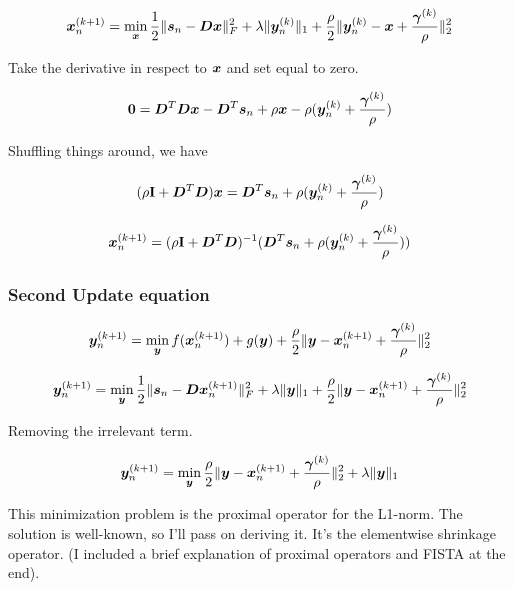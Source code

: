 \documentclass{article}
\begin{document}
\begin{equation}
\bm{x}_n^{(k + 1)} = \min_{\bm{x}} \frac{1}{2}\|\bm{s}_n - \bm{D}\bm{x}\|_F^2 + \lambda\|\bm{y}_n^{(k)}\|_1 + \frac{\rho}{2}\|\bm{y}_n^{(k)} - \bm{x} + \frac{\bm{\gamma}^{(k)}}{\rho}\|_2^2
\end{equation}

Take the derivative in respect to $\bm{x}$ and set equal to zero.

\begin{equation}
\bm{0} = \bm{D}^T\bm{D}\bm{x} - \bm{D}^T\bm{s}_n + \rho\bm{x} - \rho(\bm{y}_n^{(k)}  + \frac{\bm{\gamma}^{(k)}}{\rho})
\end{equation}

Shuffling things around, we have

\begin{equation}
(\rho{\bf I} + \bm{D}^T\bm{D})\bm{x} = \bm{D}^T\bm{s}_n + \rho(\bm{y}_n^{(k)}  + \frac{\bm{\gamma}^{(k)}}{\rho})
\end{equation}

\begin{equation}
\bm{x}_n^{(k + 1)} = (\rho{\bf I} + \bm{D}^T\bm{D})^{-1}(\bm{D}^T\bm{s}_n + \rho(\bm{y}_n^{(k)}  + \frac{\bm{\gamma}^{(k)}}{\rho}))
\end{equation}

\subsubsection{Second Update equation}
\begin{equation}
\bm{y}_n^{(k + 1)} = \min_{\bm{y}} f(\bm{x}_n^{(k + 1)}) + g(\bm{y}) + \frac{\rho}{2}\|\bm{y} - \bm{x}_n^{(k + 1)} + \frac{\bm{\gamma}^{(k)}}{\rho}\|_2^2
\end{equation}

\begin{equation}
\bm{y}_n^{(k + 1)} = \min_{\bm{y}} \frac{1}{2}\|\bm{s}_n - \bm{D}\bm{x}_n^{(k + 1)}\|_F^2 + \lambda\|\bm{y}\|_1 + \frac{\rho}{2}\|\bm{y} - \bm{x}_n^{(k + 1)} + \frac{\bm{\gamma}^{(k)}}{\rho}\|_2^2
\end{equation}

Removing the irrelevant term.

\begin{equation}
\bm{y}_n^{(k + 1)} = \min_{\bm{y}}  \frac{\rho}{2}\|\bm{y} - \bm{x}_n^{(k + 1)} + \frac{\bm{\gamma}^{(k)}}{\rho}\|_2^2 + \lambda\|\bm{y}\|_1
\end{equation}

This minimization problem is the proximal operator for the L1-norm. The solution is well-known, so I'll pass on deriving it. It's the elementwise shrinkage operator. (I included a brief explanation of proximal operators and FISTA at the end).
\end{document}
